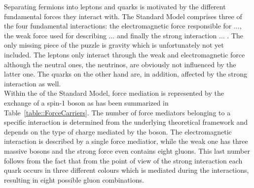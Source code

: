 Separating fermions into leptons and quarks is motivated by the different fundamental forces they interact with.
The Standard Model comprises three of the four fundamental interactions: the electromagnetic force responsible for ..., the weak force used for describing ... and finally the strong interaction ... .
The only missing piece of the puzzle is gravity which is unfortunately not yet included.
The leptons only interact through the weak and electromagnetic force although the neutral ones, the neutrinos, are obviously not influenced by the latter one. The quarks on the other hand are, in addition, affected by the strong interaction as well.
\\
Within the of the Standard Model, force mediation is represented by the exchange of a spin-1 boson as has been summarized in Table~\ref{table::ForceCarriers}.
The number of force mediators belonging to a specific interaction is determined from the underlying theoretical framework and depends on the type of charge mediated by the boson. The electromagnetic interaction is described by a single force mediatior, while the weak one has three massive bosons and the strong force even contains eight gluons.
This last number follows from the fact that from the point of view of the strong interaction each quark occurs in three different colours which is mediated during the interactions, resulting in eight possible gluon combinations.

